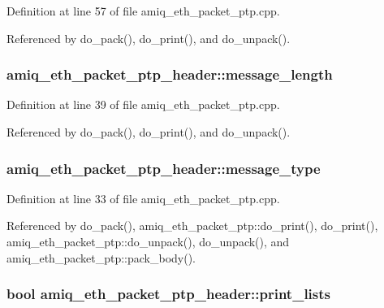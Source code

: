 Definition at line 57 of file amiq\_\-eth\_\-packet\_\-ptp.cpp.

Referenced by do\_\-pack(), do\_\-print(), and do\_\-unpack().\hypertarget{classamiq__eth__packet__ptp__header_a815ae17dbbf6f031982993da0e714be5}{
\subsubsection[{message\_\-length}]{ {\bf amiq\_\-eth\_\-packet\_\-ptp\_\-header::message\_\-length}}}
\label{classamiq__eth__packet__ptp__header_a815ae17dbbf6f031982993da0e714be5}


Definition at line 39 of file amiq\_\-eth\_\-packet\_\-ptp.cpp.

Referenced by do\_\-pack(), do\_\-print(), and do\_\-unpack().\hypertarget{classamiq__eth__packet__ptp__header_a77d4684093a9017850a8abddbba8dde4}{
\subsubsection[{message\_\-type}]{ {\bf amiq\_\-eth\_\-packet\_\-ptp\_\-header::message\_\-type}}}
\label{classamiq__eth__packet__ptp__header_a77d4684093a9017850a8abddbba8dde4}


Definition at line 33 of file amiq\_\-eth\_\-packet\_\-ptp.cpp.

Referenced by do\_\-pack(), amiq\_\-eth\_\-packet\_\-ptp::do\_\-print(), do\_\-print(), amiq\_\-eth\_\-packet\_\-ptp::do\_\-unpack(), do\_\-unpack(), and amiq\_\-eth\_\-packet\_\-ptp::pack\_\-body().\hypertarget{classamiq__eth__packet__ptp__header_a0461d63c0667a1d6a1fb32185fa4fcf0}{
\subsubsection[{print\_\-lists}]{\setlength{\rightskip}{0pt plus 5cm}bool {\bf amiq\_\-eth\_\-packet\_\-ptp\_\-header::print\_\-lists}}}
\label{classamiq__eth__packet__ptp__header_a0461d63c0667a1d6a1fb32185fa4fcf0}



